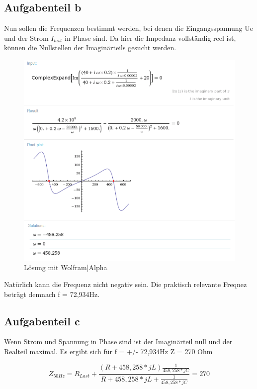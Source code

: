 \documentclass[%
  a4paper, %
  12pt, %
   article, %
  titlepage
]{scrartcl}
\begin{document}
\clearpage

\subsection{Aufgabenteil b}
Nun sollen die Frequenzen bestimmt werden, bei denen die Eingangsspannung Ue
und der Strom $I_{last}$ in Phase sind. Da hier die Impedanz vollständig reel ist, können die Nullstellen der Imaginärteils gesucht werden.

\begin{figure}[h]
\includegraphics[width=\textwidth]{wolfram3.png}
\caption{Lösung mit Wolfram|Alpha}
\label{fig5}
\end{figure}

Natürlich kann die Frequenz nicht negativ sein. Die praktisch relevante Freqnez beträgt demnach f = 72,934Hz.

\clearpage


\subsection{Aufgabenteil c}

Wenn Strom und Spannung in Phase sind ist der Imaginärteil null und der Realteil maximal. 
Es ergibt sich für f = +/- 72,934Hz Z = 270 Ohm

\begin{equation}
Z_{50Hz}=R_{Last}+\frac{(R+458,258*j L)\frac{1}{458,258*j C}}{R+458,258*j L+\frac{1}{458,258*j C}} = 270
\end{equation}
\end{document}
